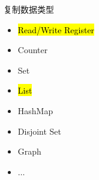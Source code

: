 \begin{frame}{}
  \begin{center}
    \begin{minipage}{0.50\textwidth}
      {\large 复制数据类型}  

      \vspace{0.20cm}
      \begin{itemize}
	\setlength{\itemsep}{4pt}
	\item \hl{Read/Write Register}
	\item Counter
	\item Set
	\item \hl{List}
	\item HashMap
	\item Disjoint Set
	\item Graph
	\item $\dots$
      \end{itemize}
    \end{minipage}
  \end{center}
\end{frame}

\begin{frame}{}
\end{frame}

% 
% 
